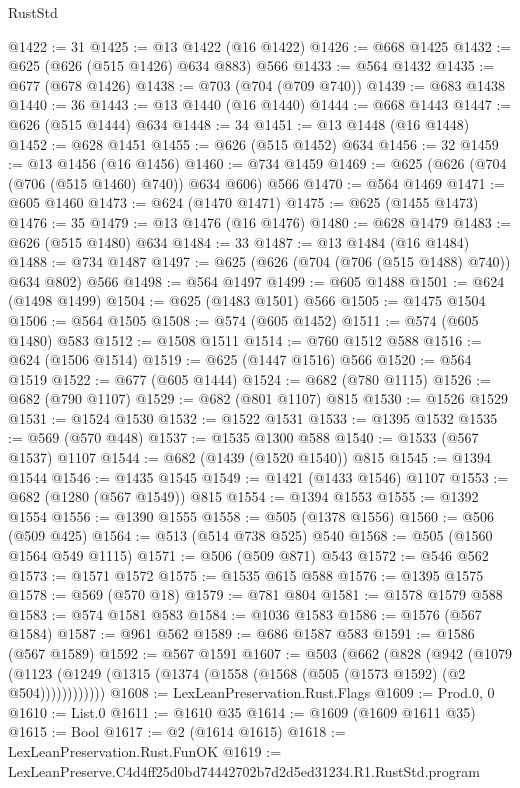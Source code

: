 \begin{lexlean}{RustStd}
\begin{coremodule}
@1422 := 31
@1425 := @13 @1422 (@16 @1422)
@1426 := @668 @1425
@1432 := @625 (@626 (@515 @1426) @634 @883) @566
@1433 := @564 @1432
@1435 := @677 (@678 @1426)
@1438 := @703 (@704 (@709 @740))
@1439 := @683 @1438
@1440 := 36
@1443 := @13 @1440 (@16 @1440)
@1444 := @668 @1443
@1447 := @626 (@515 @1444) @634
@1448 := 34
@1451 := @13 @1448 (@16 @1448)
@1452 := @628 @1451
@1455 := @626 (@515 @1452) @634
@1456 := 32
@1459 := @13 @1456 (@16 @1456)
@1460 := @734 @1459
@1469 := @625 (@626 (@704 (@706 (@515 @1460) @740)) @634 @606) @566
@1470 := @564 @1469
@1471 := @605 @1460
@1473 := @624 (@1470 @1471)
@1475 := @625 (@1455 @1473)
@1476 := 35
@1479 := @13 @1476 (@16 @1476)
@1480 := @628 @1479
@1483 := @626 (@515 @1480) @634
@1484 := 33
@1487 := @13 @1484 (@16 @1484)
@1488 := @734 @1487
@1497 := @625 (@626 (@704 (@706 (@515 @1488) @740)) @634 @802) @566
@1498 := @564 @1497
@1499 := @605 @1488
@1501 := @624 (@1498 @1499)
@1504 := @625 (@1483 @1501) @566
@1505 := @1475 @1504
@1506 := @564 @1505
@1508 := @574 (@605 @1452)
@1511 := @574 (@605 @1480) @583
@1512 := @1508 @1511
@1514 := @760 @1512 @588
@1516 := @624 (@1506 @1514)
@1519 := @625 (@1447 @1516) @566
@1520 := @564 @1519
@1522 := @677 (@605 @1444)
@1524 := @682 (@780 @1115)
@1526 := @682 (@790 @1107)
@1529 := @682 (@801 @1107) @815
@1530 := @1526 @1529
@1531 := @1524 @1530
@1532 := @1522 @1531
@1533 := @1395 @1532
@1535 := @569 (@570 @448)
@1537 := @1535 @1300 @588
@1540 := @1533 (@567 @1537) @1107
@1544 := @682 (@1439 (@1520 @1540)) @815
@1545 := @1394 @1544
@1546 := @1435 @1545
@1549 := @1421 (@1433 @1546) @1107
@1553 := @682 (@1280 (@567 @1549)) @815
@1554 := @1394 @1553
@1555 := @1392 @1554
@1556 := @1390 @1555
@1558 := @505 (@1378 @1556)
@1560 := @506 (@509 @425)
@1564 := @513 (@514 @738 @525) @540
@1568 := @505 (@1560 @1564 @549 @1115)
@1571 := @506 (@509 @871) @543
@1572 := @546 @562
@1573 := @1571 @1572
@1575 := @1535 @615 @588
@1576 := @1395 @1575
@1578 := @569 (@570 @18)
@1579 := @781 @804
@1581 := @1578 @1579 @588
@1583 := @574 @1581 @583
@1584 := @1036 @1583
@1586 := @1576 (@567 @1584)
@1587 := @961 @562
@1589 := @686 @1587 @583
@1591 := @1586 (@567 @1589)
@1592 := @567 @1591
@1607 := @503
    (@662
      (@828
        (@942
          (@1079 (@1123 (@1249 (@1315 (@1374 (@1558 (@1568 (@505 (@1573 @1592) (@2 @504))))))))))))
@1608 := LexLeanPreservation.Rust.Flags
@1609 := Prod.{0, 0}
@1610 := List.{0}
@1611 := @1610 @35
@1614 := @1609 (@1609 @1611 @35)
@1615 := Bool
@1617 := @2 (@1614 @1615)
@1618 := LexLeanPreservation.Rust.FunOK
@1619 := LexLeanPreserve.C4d4ff25d0bd74442702b7d2d5ed31234.R1.RustStd.program

\end{coremodule}
\end{lexlean}
